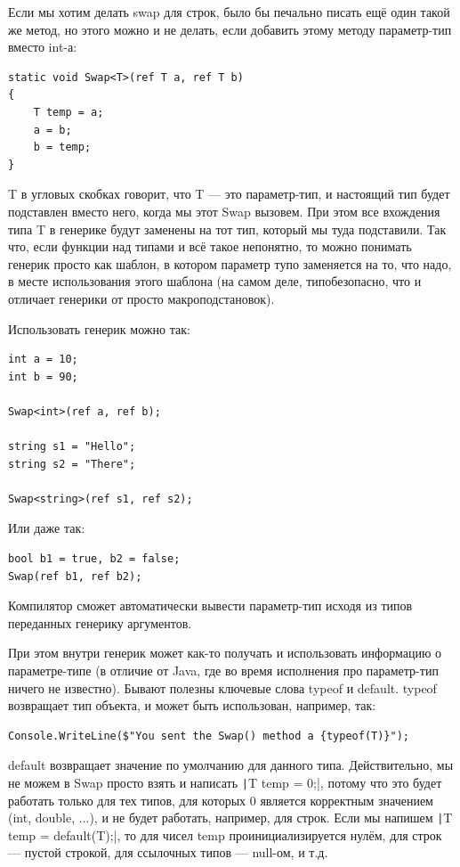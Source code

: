 \documentclass[a5paper]{article}
\begin{document}
Если мы хотим делать swap для строк, было бы печально писать ещё один такой же метод, но этого можно и не делать, если добавить этому методу параметр-тип вместо int-а:

\begin{verbatim}
static void Swap<T>(ref T a, ref T b)
{
    T temp = a;
    a = b;
    b = temp;
}
\end{verbatim}

T в угловых скобках говорит, что T --- это параметр-тип, и настоящий тип будет подставлен вместо него, когда мы этот Swap вызовем. При этом все вхождения типа T в генерике будут заменены на тот тип, который мы туда подставили. Так что, если функции над типами и всё такое непонятно, то можно понимать генерик просто как шаблон, в котором параметр тупо заменяется на то, что надо, в месте использования этого шаблона (на самом деле, типобезопасно, что и отличает генерики от просто макроподстановок).

Использовать генерик можно так:

\begin{verbatim}
int a = 10;
int b = 90;

Swap<int>(ref a, ref b);

string s1 = "Hello";
string s2 = "There";

Swap<string>(ref s1, ref s2);
\end{verbatim}

Или даже так:

\begin{verbatim}
bool b1 = true, b2 = false;
Swap(ref b1, ref b2);
\end{verbatim}

Компилятор сможет автоматически вывести параметр-тип исходя из типов переданных генерику аргументов. 

При этом внутри генерик может как-то получать и использовать информацию о параметре-типе (в отличие от Java, где во время исполнения про параметр-тип ничего не известно). Бывают полезны ключевые слова typeof и default. typeof возвращает тип объекта, и может быть использован, например, так:

\begin{verbatim}
Console.WriteLine($"You sent the Swap() method a {typeof(T)}");
\end{verbatim}

default возвращает значение по умолчанию для данного типа. Действительно, мы не можем в Swap просто взять и написать \texttt|T temp = 0;|, потому что это будет работать только для тех типов, для которых 0 является корректным значением (int, double, ...), и не будет работать, например, для строк. Если мы напишем \texttt|T temp = default(T);|, то для чисел temp проинициализируется нулём, для строк --- пустой строкой, для ссылочных типов --- null-ом, и т.д.
\end{document}
